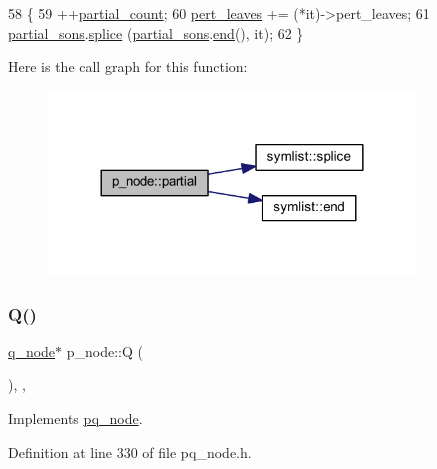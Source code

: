 \begin{DoxyCode}
58 \{
59     ++\mbox{\hyperlink{classp__node_a9ac93f9a0f474dcc74312e820fde73b6}{partial\_count}};
60     \mbox{\hyperlink{classpq__node_a3fb78609f93f41efd6826ed3169fc312}{pert\_leaves}} += (*it)->pert\_leaves;
61     \mbox{\hyperlink{classp__node_a8acc45be68133af1b6a2823875729798}{partial\_sons}}.\mbox{\hyperlink{classsymlist_ac2bd4d9db62ea6a3282662c62a97c3b2}{splice}} (\mbox{\hyperlink{classp__node_a8acc45be68133af1b6a2823875729798}{partial\_sons}}.\mbox{\hyperlink{classsymlist_a7283589fa01f79d722f8256d7a6a7883}{end}}(), it);
62 \}
\end{DoxyCode}
Here is the call graph for this function\+:\nopagebreak
\begin{figure}[H]
\begin{center}
\leavevmode
\includegraphics[width=276pt]{classp__node_a217e83b61144fe6b64e3fbade0aecfcf_cgraph}
\end{center}
\end{figure}
\mbox{\label{classp__node_a93d94db17c833adaaf66bacbc8f55cec}} 
\subsubsection{\texorpdfstring{Q()}{Q()}}
{\footnotesize\ttfamily \mbox{\hyperlink{classq__node}{q\+\_\+node}}$\ast$ p\+\_\+node\+::Q (\begin{DoxyParamCaption}{ }\end{DoxyParamCaption})\hspace{0.3cm}{\ttfamily [inline]}, {\ttfamily [private]}, {\ttfamily [virtual]}}



Implements \mbox{\hyperlink{classpq__node_aeeefcfcd19dbe4ca94e190006e8dd484}{pq\+\_\+node}}.



Definition at line 330 of file pq\+\_\+node.\+h.


